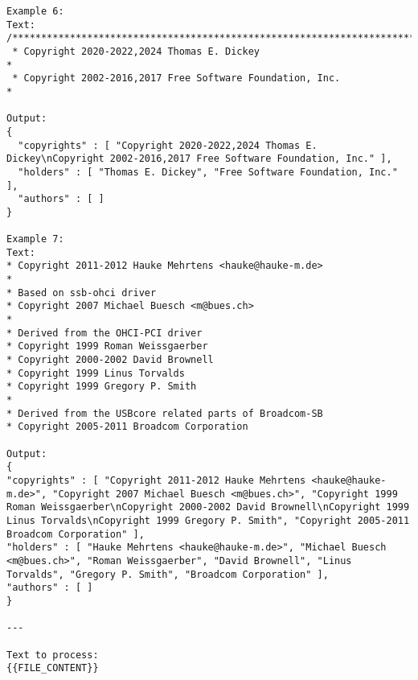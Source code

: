 \begin{lstlisting}[keepspaces=true]
Example 6:
Text:
/****************************************************************************
 * Copyright 2020-2022,2024 Thomas E. Dickey                                *
 * Copyright 2002-2016,2017 Free Software Foundation, Inc.                  *

Output:
{
  "copyrights" : [ "Copyright 2020-2022,2024 Thomas E. Dickey\nCopyright 2002-2016,2017 Free Software Foundation, Inc." ],
  "holders" : [ "Thomas E. Dickey", "Free Software Foundation, Inc." ],
  "authors" : [ ]
}

Example 7:
Text:
* Copyright 2011-2012 Hauke Mehrtens <hauke@hauke-m.de>
*
* Based on ssb-ohci driver
* Copyright 2007 Michael Buesch <m@bues.ch>
*
* Derived from the OHCI-PCI driver
* Copyright 1999 Roman Weissgaerber
* Copyright 2000-2002 David Brownell
* Copyright 1999 Linus Torvalds
* Copyright 1999 Gregory P. Smith
*
* Derived from the USBcore related parts of Broadcom-SB
* Copyright 2005-2011 Broadcom Corporation

Output:
{
"copyrights" : [ "Copyright 2011-2012 Hauke Mehrtens <hauke@hauke-m.de>", "Copyright 2007 Michael Buesch <m@bues.ch>", "Copyright 1999 Roman Weissgaerber\nCopyright 2000-2002 David Brownell\nCopyright 1999 Linus Torvalds\nCopyright 1999 Gregory P. Smith", "Copyright 2005-2011 Broadcom Corporation" ],
"holders" : [ "Hauke Mehrtens <hauke@hauke-m.de>", "Michael Buesch <m@bues.ch>", "Roman Weissgaerber", "David Brownell", "Linus Torvalds", "Gregory P. Smith", "Broadcom Corporation" ],
"authors" : [ ]
}

---

Text to process:
{{FILE_CONTENT}}
\end{lstlisting}